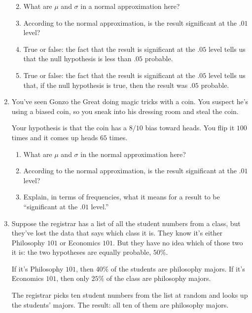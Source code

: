 \documentclass[justified]{tufte-book}
\providecommand{\tightlist}{%
  \setlength{\itemsep}{0pt}\setlength{\parskip}{0pt}}
\theoremstyle{definition}
\theoremstyle{definition}
\theoremstyle{definition}
\theoremstyle{definition}
\theoremstyle{remark}
\begin{document}
\begin{enumerate}
  \begin{enumerate}
  \def\labelenumii{\alph{enumii}.}
  \tightlist
  \item
    What are \(\mu\) and \(\sigma\) in a normal approximation here?
  \item
    According to the normal approximation, is the result significant at the \(.01\) level?
  \item
    True or false: the fact that the result is significant at the \(.05\) level tells us that the null hypothesis is less than \(.05\) probable.
  \item
    True or false: the fact that the result is significant at the \(.05\) level tells us that, if the null hypothesis is true, then the result was \(.05\) probable.
  \end{enumerate}
\item
  You've seen Gonzo the Great doing magic tricks with a coin. You suspect he's using a biased coin, so you sneak into his dressing room and steal the coin.

  Your hypothesis is that the coin has a \(8/10\) bias toward heads. You flip it \(100\) times and it comes up heads \(65\) times.

  \begin{enumerate}
  \def\labelenumii{\alph{enumii}.}
  \tightlist
  \item
    What are \(\mu\) and \(\sigma\) in the normal approximation here?
  \item
    According to the normal approximation, is the result significant at the \(.01\) level?
  \item
    Explain, in terms of frequencies, what it means for a result to be ``significant at the \(.01\) level.''
  \end{enumerate}
\item
  Suppose the registrar has a list of all the student numbers from a class, but they've lost the data that says which class it is. They know it's either Philosophy \(101\) or Economics \(101\). But they have no idea which of those two it is: the two hypotheses are equally probable, \(50\%\).

  If it's Philosophy \(101\), then \(40\%\) of the students are philosophy majors. If it's Economics \(101\), then only \(25\%\) of the class are philosophy majors.

  The registrar picks ten student numbers from the list at random and looks up the students' majors. The result: all ten of them are philosophy majors.


\end{enumerate}
\end{document}
